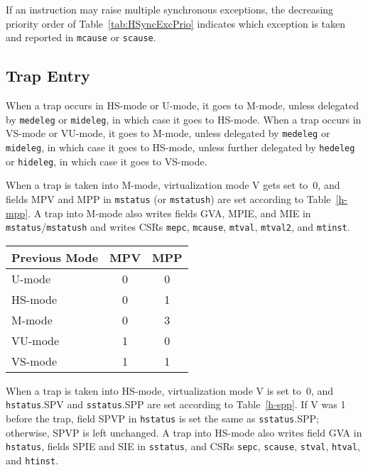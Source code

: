 If an instruction may raise multiple synchronous exceptions, the
decreasing priority order of Table~\ref{tab:HSyncExcPrio} indicates
which exception is taken and reported in {\tt mcause} or {\tt scause}.

\FloatBarrier

\subsection{Trap Entry}

When a trap occurs in HS-mode or U-mode, it goes to M-mode, unless
delegated by {\tt medeleg} or {\tt mideleg}, in which case it goes to HS-mode.
When a trap occurs in VS-mode or VU-mode, it goes to M-mode, unless
delegated by {\tt medeleg} or {\tt mideleg}, in which case it goes to HS-mode,
unless further delegated by {\tt hedeleg} or {\tt hideleg}, in which case it
goes to VS-mode.

When a trap is taken into M-mode, virtualization mode V gets set to~0,
and fields MPV and MPP in {\tt mstatus}
(or {\tt mstatush}) are set according to
Table~\ref{h-mpp}.
A trap into M-mode also writes fields GVA, MPIE, and MIE in
{\tt mstatus}/{\tt mstatush} and writes CSRs {\tt mepc}, {\tt mcause},
{\tt mtval}, {\tt mtval2}, and {\tt mtinst}.

\begin{table*}[h!]
\begin{center}
\begin{tabular}{|l|c|c|}
  \hline
  Previous Mode & MPV & MPP \\ \hline
  U-mode        & 0   & 0   \\
  HS-mode       & 0   & 1   \\
  M-mode        & 0   & 3   \\ \hline
  VU-mode       & 1   & 0   \\
  VS-mode       & 1   & 1   \\ \hline
\end{tabular}
\end{center}
\caption{Value of {\tt mstatus}/{\tt mstatush} fields MPV and MPP after a trap into M-mode.
Upon trap return, MPV is ignored when MPP=3.}
\label{h-mpp}
\end{table*}

When a trap is taken into HS-mode, virtualization mode V is set to~0,
and {\tt hstatus}.SPV and {\tt sstatus}.SPP are
set according to Table~\ref{h-spp}.
If V was 1 before the trap, field SPVP in {\tt hstatus} is set the same as
{\tt sstatus}.SPP;
otherwise, SPVP is left unchanged.
A trap into HS-mode also writes field GVA in {\tt hstatus}, fields
SPIE and SIE in {\tt sstatus}, and CSRs {\tt sepc}, {\tt scause},
{\tt stval}, {\tt htval}, and {\tt htinst}.

